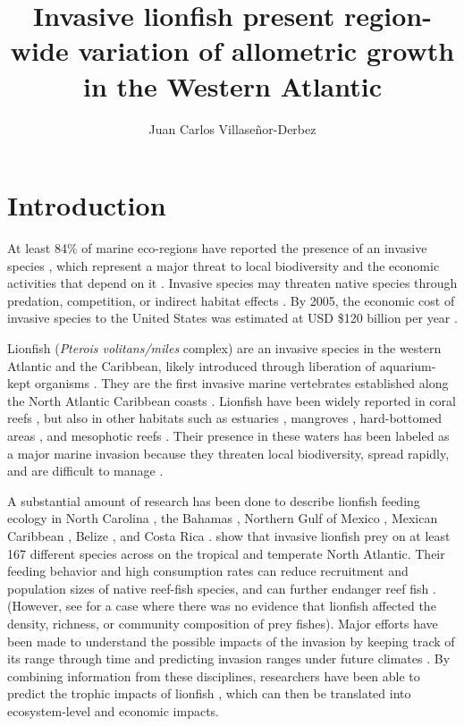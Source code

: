 \documentclass[fleqn,10pt,lineno]{wlpeerj} %
\title{Invasive lionfish present region-wide variation of allometric growth in
the Western Atlantic}
\author[1]{Juan Carlos Villaseñor-Derbez}
\affil[1]{Bren School of Environmental Sciences and Management, University of
California Santa Barbara, Santa Barbara, California, U.S.}
\begin{document}
\flushbottom
\maketitle
\thispagestyle{empty}

\section*{Introduction}

At least 84\% of marine eco-regions have reported the presence of an
invasive species \citep{molnar_2008}, which represent a major threat to
local biodiversity and the economic activities that depend on it
\citep{bax_2003}. Invasive species may threaten native species through
predation, competition, or indirect habitat effects
\citep{davis_2003, gurevitch_2004}. By 2005, the economic cost of
invasive species to the United States was estimated at USD \$120 billion
per year \citep{pimentel_2005}.

Lionfish (\emph{Pterois volitans/miles} complex) are an invasive species
in the western Atlantic and the Caribbean, likely introduced through
liberation of aquarium-kept organisms \citep{betancurr_2011}. They are
the first invasive marine vertebrates established along the North
Atlantic Caribbean coasts
\citep{schofield_2009,schofield_2010,sabidoitza_2016}. Lionfish have
been widely reported in coral reefs \citep{aguilarperera_2010}, but also
in other habitats such as estuaries \citep{jud_2011}, mangroves
\citep{barbour_2010}, hard-bottomed areas \citep{muoz_2011}, and
mesophotic reefs \citep{andradibrown_2017}. Their presence in these
waters has been labeled as a major marine invasion because they threaten
local biodiversity, spread rapidly, and are difficult to manage
\citep{hixon_2016}.

A substantial amount of research has been done to describe lionfish
feeding ecology in North Carolina \citep{muoz_2011}, the Bahamas
\citep{morris_2009,cote_2013}, Northern Gulf of Mexico
\citep{dahl_2014}, Mexican Caribbean
\citep{valdezmoreno_2012,villaseorderbez_2014}, Belize
\citep{hackerott_2017}, and Costa Rica \citep{sandel_2015}.
\citet{peake_2018} show that invasive lionfish prey on at least 167
different species across on the tropical and temperate North Atlantic.
Their feeding behavior and high consumption rates can reduce recruitment
and population sizes of native reef-fish species, and can further
endanger reef fish \citep{albins_2008, green_2012,rocha_2015}. (However,
see \citet{hackerott_2017} for a case where there was no evidence that
lionfish affected the density, richness, or community composition of
prey fishes). Major efforts have been made to understand the possible
impacts of the invasion by keeping track of its range through time
\citep{schofield_2009,schofield_2010} and predicting invasion ranges
under future climates \citep{grieve_2016}. By combining information from
these disciplines, researchers have been able to predict the trophic
impacts of lionfish \citep{ariasgonzalez_2011}, which can then be
translated into ecosystem-level and economic impacts.
\end{document}
